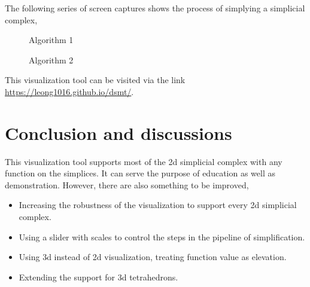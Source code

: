\documentclass[12pt]{article}
\begin{document}
The following series of screen captures shows the process of simplying a simplicial complex,

\begin{figure}[H]
\caption{Algorithm 1}
\label{fig:name}
\end{figure}

\begin{figure}[H]
\caption{Algorithm 2}
\label{fig:name}
\end{figure}

This visualization tool can be visited via the link \url{https://leong1016.github.io/dsmt/}. 

\section{Conclusion and discussions}
This visualization tool supports most of the 2d simplicial complex with any function on the simplices. It can serve the purpose of education as well as demonstration. However, there are also something to be improved,
\begin{itemize}
    \item Increasing the robustness of the visualization to support every 2d simplicial complex.
    \item Using a slider with scales to control the steps in the pipeline of simplification.
    \item Using 3d instead of 2d visualization, treating function value as elevation.
    \item Extending the support for 3d tetrahedrons.
\end{itemize}
\end{document}
